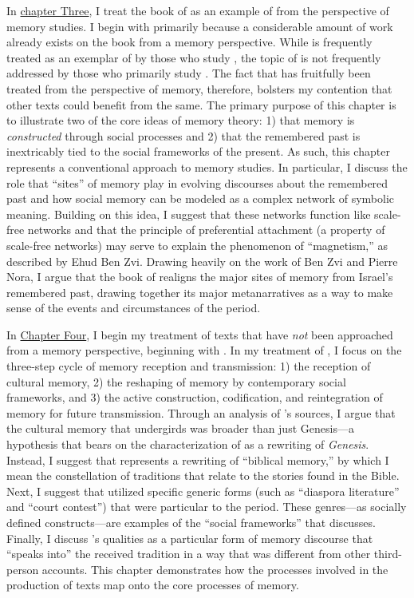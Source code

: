 In \hyperref[chap:chronicles]{chapter Three}, I treat the book of \chronicles as an example of \rwb from the perspective of memory studies. I begin with \chronicles primarily because a considerable amount of work already exists on the book from a memory perspective. While \chronicles is frequently treated as an exemplar of \rwb by those who study \rwb, the topic of \rwb is not frequently addressed by those who primarily study \chronicles. The fact that \chronicles has fruitfully been treated from the perspective of memory, therefore, bolsters my contention that other \rwb texts could benefit from the same. The primary purpose of this chapter is to illustrate two of the core ideas of memory theory: 1) that memory is \emph{constructed} through social processes and 2) that the remembered past is inextricably tied to the social frameworks of the present.  As such, this chapter represents a conventional approach to memory studies. In particular, I discuss the role that ``sites'' of memory play in evolving discourses about the remembered past and how social memory can be modeled as a complex network of symbolic meaning. Building on this idea, I suggest that these networks function like scale-free networks and that the principle of preferential attachment (a property of scale-free networks) may serve to explain the phenomenon of ``magnetism,'' as described by Ehud Ben Zvi. Drawing heavily on the work of Ben Zvi and Pierre Nora, I argue that the book of \chronicles realigns the major sites of memory from Israel's remembered past, drawing together its major metanarratives as a way to make sense of the events and circumstances of the \secondtemple period.

In \hyperref[chap:ga]{Chapter Four}, I begin my treatment of \rwb texts that have \emph{not} been approached from a memory perspective, beginning with \ga. In my treatment of \ga, I focus on the three-step cycle of memory reception and transmission: 1) the reception of cultural memory, 2) the reshaping of memory by contemporary social frameworks, and 3) the active construction, codification, and reintegration of memory for future transmission. Through an analysis of \ga's sources, I argue that the cultural memory that undergirds \ga was broader than just Genesis---a hypothesis that bears on the characterization of \ga as a rewriting of \emph{Genesis}. Instead, I suggest that \ga represents a rewriting of ``biblical memory,'' by which I mean the constellation of traditions that relate to the stories found in the Bible. Next, I suggest that \ga utilized specific generic forms (such as ``diaspora literature'' and ``court contest'') that were particular to the \secondtemple period. These genres---as socially defined constructs---are examples of the ``social frameworks'' that \halbwachs discusses. Finally, I discuss \ga's \psgraphical qualities as a particular form of memory discourse that ``speaks into'' the received tradition in a way that was different from other third-person accounts. This chapter demonstrates how the processes involved in the production of \rwb texts map onto the core processes of memory.


